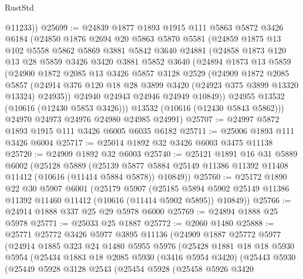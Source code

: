 \begin{lexlean}{RustStd}
\begin{coremodule}
        @11233))
@25699 := @24839
    @1877
    @1893
    @1915
    @111
    @5863
    @5872
    @3426
    @6184
    (@24850
      @1876
      @2694
      @20
      @5863
      @5870
      @5581
      (@24859
        @1875
        @13
        @102
        @5558
        @5862
        @5869
        @3881
        @5842
        @3640
        @24881
        (@24858
          @1873
          @120
          @13
          @28
          @5859
          @3426
          @3420
          @3881
          @5852
          @3640
          (@24894
            @1873
            @13
            @5859
            (@24900
              @1872
              @2085
              @13
              @3426
              @5857
              @3128
              @2529
              (@24909
                @1872
                @2085
                @5857
                (@24914 @376 @120 @18 @28 @3899 @3420 (@24923 @375 @3899 @13320 @13324) @24935))
              @24940
              @24943
              @24946
              @24949
              @10849))
          @24955
          @13532
          (@10616 (@12430 @5853 @3426)))
        @13532
        (@10616 (@12430 @5843 @5862)))
      @24970
      @24973
      @24976
      @24980
      @24985
      @24991)
@25707 := @24997 @5872 @1893 @1915 @111 @3426 @6005 @6035 @6182
@25711 := @25006 @1893 @111 @3426 @6004
@25717 := @25014 @1892 @32 @3426 @6003 @3475 @11138
@25720 := @24909 @1892 @32 @6003
@25740 := @25121
    @1891
    @16
    @31
    @5889
    @6002
    (@25128
      @5889
      (@25139 @5877 @5884 @25149 @11386 @11392 @11408 @11412 (@10616 (@11414 @5884 @5878)) @10849))
@25760 := @25172
    @1890
    @22
    @30
    @5907
    @6001
    (@25179
      @5907
      (@25185 @5894 @5902 @25149 @11386 @11392 @11460 @11412 (@10616 (@11414 @5902 @5895)) @10849))
@25766 := @24914 @1888 @337 @25 @29 @5978 @6000
@25769 := @24894 @1888 @25 @5978
@25771 := @25033 @25 @1887
@25772 := @2060 @1480
@25888 := @25771
    @25772
    @3426
    @5977
    @3895
    @11136
    (@24909
      @1887
      @25772
      @5977
      (@24914
        @1885
        @323
        @24
        @1480
        @5955
        @5976
        (@25428
          @1881
          @18
          @18
          @5930
          @5954
          (@25434
            @1883
            @18
            @2085
            @5930
            (@3416 @5954 @3420)
            (@25443
              @5930
              (@25449
                @5928
                @3128
                @2543
                (@25454
                  @5928
                  (@25458
                    @5926
                    @3420

\end{coremodule}
\end{lexlean}
